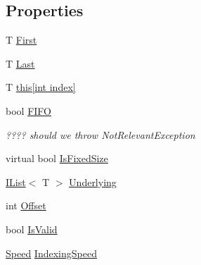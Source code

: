\subsection*{Properties}
\begin{DoxyCompactItemize}
\item 
T \hyperlink{class_c5_1_1_wrapped_array_a30b1c7c01b288c05e8d7594a1d85f1d5}{First}
\item 
T \hyperlink{class_c5_1_1_wrapped_array_a821efefc3fa34125b7a5f2b0108e3ef4}{Last}
\item 
T \hyperlink{class_c5_1_1_wrapped_array_a3a76c7661d9e1b1612cdbcf2686c02c4}{this\mbox{[}int index\mbox{]}}
\item 
bool \hyperlink{class_c5_1_1_wrapped_array_a5b8e3d7b8f13a7cf59f6ae04c22b60b5}{F\+I\+F\+O}
\begin{DoxyCompactList}\small\item\em ???? should we throw Not\+Relevant\+Exception \end{DoxyCompactList}\item 
virtual bool \hyperlink{class_c5_1_1_wrapped_array_a05fa96081a5ae212ae531df648d543c5}{Is\+Fixed\+Size}
\item 
\hyperlink{interface_c5_1_1_i_list}{I\+List}$<$ T $>$ \hyperlink{class_c5_1_1_wrapped_array_a696f786dd743babd7c4978785b2650d3}{Underlying}
\item 
int \hyperlink{class_c5_1_1_wrapped_array_a0c4465bdc31669ec9b73a23118a10195}{Offset}
\item 
bool \hyperlink{class_c5_1_1_wrapped_array_a3ed2a1a22a1ade67fa7b8a55ab91ef47}{Is\+Valid}
\item 
\hyperlink{namespace_c5_a615ba88dcdaa8d5a3c5f833a73d7fad6}{Speed} \hyperlink{class_c5_1_1_wrapped_array_a9ddee14e5fc0e1c4d2cfe0e3809018f1}{Indexing\+Speed}

\end{DoxyCompactItemize}
